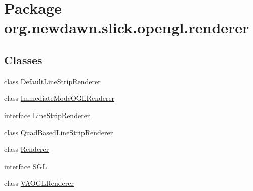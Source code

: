 \hypertarget{namespaceorg_1_1newdawn_1_1slick_1_1opengl_1_1renderer}{}\section{Package org.\+newdawn.\+slick.\+opengl.\+renderer}
\label{namespaceorg_1_1newdawn_1_1slick_1_1opengl_1_1renderer}
\subsection*{Classes}
\begin{DoxyCompactItemize}
\item 
class \mbox{\hyperlink{classorg_1_1newdawn_1_1slick_1_1opengl_1_1renderer_1_1_default_line_strip_renderer}{Default\+Line\+Strip\+Renderer}}
\item 
class \mbox{\hyperlink{classorg_1_1newdawn_1_1slick_1_1opengl_1_1renderer_1_1_immediate_mode_o_g_l_renderer}{Immediate\+Mode\+O\+G\+L\+Renderer}}
\item 
interface \mbox{\hyperlink{interfaceorg_1_1newdawn_1_1slick_1_1opengl_1_1renderer_1_1_line_strip_renderer}{Line\+Strip\+Renderer}}
\item 
class \mbox{\hyperlink{classorg_1_1newdawn_1_1slick_1_1opengl_1_1renderer_1_1_quad_based_line_strip_renderer}{Quad\+Based\+Line\+Strip\+Renderer}}
\item 
class \mbox{\hyperlink{classorg_1_1newdawn_1_1slick_1_1opengl_1_1renderer_1_1_renderer}{Renderer}}
\item 
interface \mbox{\hyperlink{interfaceorg_1_1newdawn_1_1slick_1_1opengl_1_1renderer_1_1_s_g_l}{S\+GL}}
\item 
class \mbox{\hyperlink{classorg_1_1newdawn_1_1slick_1_1opengl_1_1renderer_1_1_v_a_o_g_l_renderer}{V\+A\+O\+G\+L\+Renderer}}
\end{DoxyCompactItemize}
